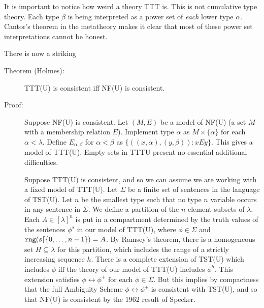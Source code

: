 \documentclass[12pt]{article}
\begin{document}
It is important to notice how weird a theory TTT is.  This is not cumulative type theory.  Each type $\beta$ is being interpreted as a power set of {\em each\/} lower type $\alpha$.  Cantor's theorem in the metatheory makes it clear that most of these power set interpretations cannot be honest.

There is now a striking

\begin{description}

\item[Theorem (Holmes):]  TTT(U) is consistent iff NF(U) is consistent.

\item[Proof:]  Suppose NF(U) is consistent.  Let $(M,E)$ be a model of NF(U) (a set $M$ with a membership relation $E$).  Implement type $\alpha$ as $M \times \{\alpha\}$ for
each $\alpha<\lambda$.  Define $E_{\alpha,\beta}$ for $\alpha<\beta$ as $\{((x,\alpha),(y,\beta)):xEy\}$.  This gives a model of TTT(U).   Empty sets in TTTU present no essential additional difficulties.

Suppose TTT(U) is consistent, and so we can assume we are working with a fixed model of TTT(U).  Let $\Sigma$ be a finite set of sentences in the language of TST(U).  Let $n$ be the smallest type such that no type $n$ variable occurs in any sentence in $\Sigma$.  We define a partition of the $n$-element subsets of $\lambda$.  Each $A \in [\lambda]^n$ is put in a compartment
determined by the truth values of the sentences $\phi^s$ in our model of TTT(U), where $\phi \in \Sigma$ and ${\tt rng}(s \lceil \{0,\ldots,n-1\}) = A$.  By Ramsey's theorem, there is a homogeneous set $H \subseteq \lambda$ for this partition, which includes the range of a strictly increasing sequence $h$.  There is a complete extension of TST(U) which includes
$\phi$ iff the theory of our model of TTT(U) includes $\phi^h$.  This extension satisfies $\phi \leftrightarrow \phi^+$ for each $\phi \in \Sigma$.  But this implies by compactness that the full Ambiguity Scheme $\phi \leftrightarrow \phi^+$ is consistent with TST(U), and so that NF(U) is consistent by the 1962 result of Specker.


\end{description}
\end{document}
